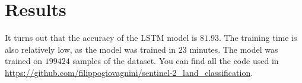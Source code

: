 \documentclass{article}
\begin{document}
\section{Results}
\label{sec:results}

It turns out that the accuracy of the LSTM model is $81.93$. The training time is also relatively low, as the model was trained in $23$ minutes. The model was trained on $199424$ samples of the dataset. You can find all the code used in \href{https://github.com/filippogiovagnini/sentinel-2_land_classification}{https://github.com/filippogiovagnini/sentinel-2\_land\_classification}.
\end{document}
